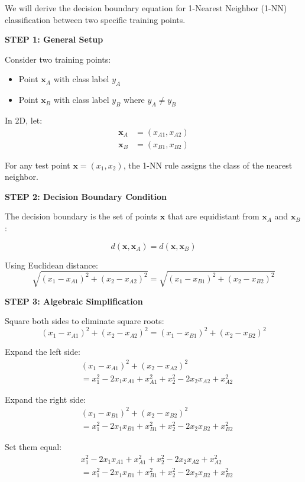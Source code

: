 \documentclass[12pt]{article}
\begin{document}
\begin{solution}
We will derive the decision boundary equation for 1-Nearest Neighbor (1-NN) classification between two specific training points.

\textbf{STEP 1: General Setup}

Consider two training points:
\begin{itemize}
    \item Point \(\mathbf{x}_A\) with class label \(y_A\)
    \item Point \(\mathbf{x}_B\) with class label \(y_B\) where \(y_A \neq y_B\)
\end{itemize}

In 2D, let:
\begin{align*}
\mathbf{x}_A &= (x_{A1}, x_{A2}) \\
\mathbf{x}_B &= (x_{B1}, x_{B2})
\end{align*}

For any test point \(\mathbf{x} = (x_1, x_2)\), the 1-NN rule assigns the class of the nearest neighbor.

\textbf{STEP 2: Decision Boundary Condition}

The decision boundary is the set of points \(\mathbf{x}\) that are equidistant from \(\mathbf{x}_A\) and \(\mathbf{x}_B\):

\[
d(\mathbf{x}, \mathbf{x}_A) = d(\mathbf{x}, \mathbf{x}_B)
\]

Using Euclidean distance:
\[
\sqrt{(x_1 - x_{A1})^2 + (x_2 - x_{A2})^2} = \sqrt{(x_1 - x_{B1})^2 + (x_2 - x_{B2})^2}
\]

\textbf{STEP 3: Algebraic Simplification}

Square both sides to eliminate square roots:
\[
(x_1 - x_{A1})^2 + (x_2 - x_{A2})^2 = (x_1 - x_{B1})^2 + (x_2 - x_{B2})^2
\]

Expand the left side:
\begin{align*}
&(x_1 - x_{A1})^2 + (x_2 - x_{A2})^2 \\
&= x_1^2 - 2x_1 x_{A1} + x_{A1}^2 + x_2^2 - 2x_2 x_{A2} + x_{A2}^2
\end{align*}

Expand the right side:
\begin{align*}
&(x_1 - x_{B1})^2 + (x_2 - x_{B2})^2 \\
&= x_1^2 - 2x_1 x_{B1} + x_{B1}^2 + x_2^2 - 2x_2 x_{B2} + x_{B2}^2
\end{align*}

Set them equal:
\begin{align*}
&x_1^2 - 2x_1 x_{A1} + x_{A1}^2 + x_2^2 - 2x_2 x_{A2} + x_{A2}^2 \\
&= x_1^2 - 2x_1 x_{B1} + x_{B1}^2 + x_2^2 - 2x_2 x_{B2} + x_{B2}^2
\end{align*}


\end{solution}
\end{document}

